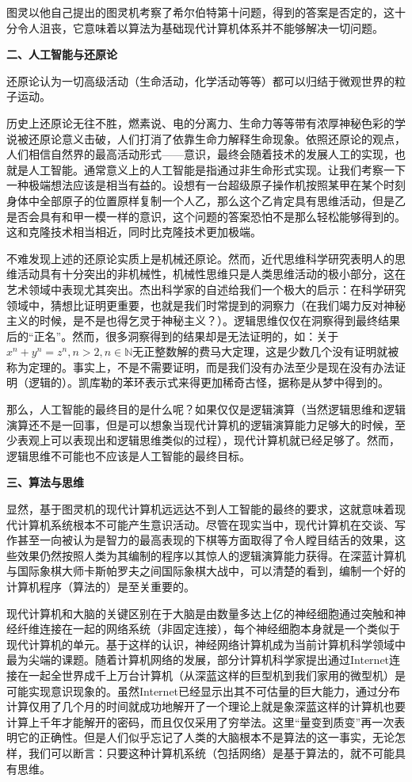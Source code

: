 图灵以他自己提出的图灵机考察了希尔伯特第十问题，得到的答案是否定的，这十分令人沮丧，它意味着以算法为基础现代计算机体系并不能够解决一切问题。

\textbf{二、人工智能与还原论}

还原论认为一切高级活动（生命活动，化学活动等等）都可以归结于微观世界的粒子运动。

历史上还原论无往不胜，燃素说、电的分离力、生命力等等带有浓厚神秘色彩的学说被还原论意义击破，人们打消了依靠生命力解释生命现象。依照还原论的观点，人们相信自然界的最高活动形式——意识，最终会随着技术的发展人工的实现，也就是人工智能。通常意义上的人工智能是指通过非生命形式实现。让我们考察一下一种极端想法应该是相当有益的。设想有一台超级原子操作机按照某甲在某个时刻身体中全部原子的位置原样复制一个人乙，那么这个乙肯定具有思维活动，但是乙是否会具有和甲一模一样的意识，这个问题的答案恐怕不是那么轻松能够得到的。这和克隆技术相当相近，同时比克隆技术更加极端。

不难发现上述的还原论实质上是机械还原论。然而，近代思维科学研究表明人的思维活动具有十分突出的非机械性，机械性思维只是人类思维活动的极小部分，这在艺术领域中表现尤其突出。杰出科学家的自述给我们一个极大的启示：在科学研究领域中，猜想比证明更重要，也就是我们时常提到的洞察力（在我们竭力反对神秘主义的时候，是不是也得乞灵于神秘主义？）。逻辑思维仅仅在洞察得到最终结果后的“正名”。然而，很多洞察得到的结果却是无法证明的，如：关于$x^n+y^n=z^n, n>2, n\in\mathbb{N}$无正整数解的费马大定理，这是少数几个没有证明就被称为定理的。事实上，不是不需要证明，而是我们没有办法至少是现在没有办法证明（逻辑的）。凯库勒的苯环表示式来得更加稀奇古怪，据称是从梦中得到的。

那么，人工智能的最终目的是什么呢？如果仅仅是逻辑演算（当然逻辑思维和逻辑演算还不是一回事，但是可以想象当现代计算机的逻辑演算能力足够大的时候，至少表观上可以表现出和逻辑思维类似的过程），现代计算机就已经足够了。然而，逻辑思维不可能也不应该是人工智能的最终目标。

\textbf{三、算法与思维}

显然，基于图灵机的现代计算机远远达不到人工智能的最终的要求，这就意味着现代计算机系统根本不可能产生意识活动。尽管在现实当中，现代计算机在交谈、写作甚至一向被认为是智力的最高表现的下棋等方面取得了令人瞠目结舌的效果，这些效果仍然按照人类为其编制的程序以其惊人的逻辑演算能力获得。在深蓝计算机与国际象棋大师卡斯帕罗夫之间国际象棋大战中，可以清楚的看到，编制一个好的计算机程序（算法的）是至关重要的。

现代计算机和大脑的关键区别在于大脑是由数量多达上亿的神经细胞通过突触和神经纤维连接在一起的网络系统（非固定连接），每个神经细胞本身就是一个类似于现代计算机的单元。基于这样的认识，神经网络计算机成为当前计算机科学领域中最为尖端的课题。随着计算机网络的发展，部分计算机科学家提出通过Internet连接在一起全世界成千上万台计算机（从深蓝这样的巨型机到我们家用的微型机）是可能实现意识现象的。虽然Internet已经显示出其不可估量的巨大能力，通过分布计算仅用了几个月的时间就成功地解开了一个理论上就是象深蓝这样的计算机也要计算上千年才能解开的密码，而且仅仅采用了穷举法。这里“量变到质变”再一次表明它的正确性。但是人们似乎忘记了人类的大脑根本不是算法的这一事实，无论怎样，我们可以断言：只要这种计算机系统（包括网络）是基于算法的，就不可能具有思维。

